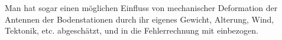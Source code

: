 Man hat sogar einen möglichen Einfluss von mechanischer Deformation der Antennen der Bodenstationen durch ihr eigenes Gewicht,
Alterung, Wind, Tektonik, etc. abgeschätzt, und in die Fehlerrechnung mit einbezogen\cite{Dittus2006}. %



